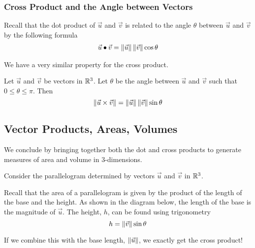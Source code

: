 \documentclass{ximera}
\begin{document}
\subsubsection*{Cross Product and the Angle between Vectors}
Recall that the dot product of $\vec{u}$ and $\vec{v}$ is related to the angle $\theta$ between $\vec{u}$ and $\vec{v}$ by the following formula
\begin{align}\label{eq:dotproductformula}\vec{u}\bullet\vec{v}=\left\|\vec{u}\right\|\left\|\vec{v}\right\|\cos\theta\end{align}

We have a very similar property for the cross product.
 
\begin{theorem}\label{th:crossproductsin}
Let $\vec{u}$ and $\vec{v}$ be vectors in $\mathbb{R}^3$. Let $\theta$ be the angle between $\vec{u}$ and $\vec{v}$ such that $0\leq\theta\leq \pi$. Then
$$\left\|\vec{u}\times\vec{v}\right\|=\left\|\vec{u}\right\|\left\|\vec{v}\right\|\sin\theta$$
\end{theorem}

\subsection*{Vector Products, Areas, Volumes}
 
We conclude by bringing together both the dot and cross products to generate measures of area and volume in $3$-dimensions.

Consider the parallelogram determined by vectors $\vec{u}$ and $\vec{v}$ in $\mathbb{R}^3$.
 
\begin{center}
\end{center}
 
Recall that the area of a parallelogram is given by the product of the length of the base and the height.
As shown in the diagram below, the length of the base is the magnitude of $\vec{u}$. The height, $h$, can be found using trigonometry $$h=\left\|\vec{v}\right\|\sin\theta$$

If we combine this with the base length, $\left\|\vec{u}\right\|$, we exactly get the cross product!
\end{document}
